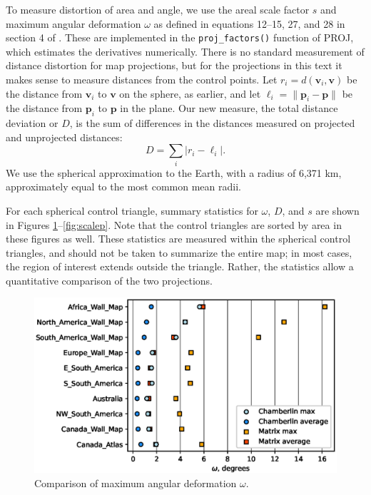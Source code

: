 \documentclass[]{interact}
\begin{document}
To measure distortion of area and angle, we use the areal scale factor $s$ and
maximum angular deformation $\omega$ as defined in equations 12--15, 27, and 28
in section 4 of \citet{snyder87}. These are implemented in the
\verb|proj_factors()| function of PROJ, which estimates the derivatives
numerically. There is no standard measurement of distance distortion for map
projections, but for the projections in this text it makes sense to measure
distances from the control points. Let $r_i = d(\mathbf v_i, \mathbf v)$ be the
distance from $\mathbf v_i$ to $\mathbf v$ on the sphere, as earlier, and let
$\ell_i = \|\mathbf p_i - \mathbf p\|$ be the distance from $\mathbf p_i$ to
$\mathbf p$ in the plane.
Our new measure, the total distance deviation or $D$, is the sum of
differences in the distances measured on projected and unprojected distances:
\begin{equation}
 D = \sum_i \left| r_i - \ell_i \right|.
\end{equation}
We use the spherical approximation to the Earth, with a radius of 6,371 km,
approximately equal to the most common mean radii. \citep{snyder87}

For each spherical control triangle, summary statistics for $\omega$, $D$, and
$s$ are shown in Figures \ref{fig:omegap}--\ref{fig:scalep}. Note that the
control triangles are sorted by area in these figures as well.
These statistics are measured within the spherical control triangles,
and should not be taken to summarize the entire map; in most cases,
the region of interest extends outside the triangle.
Rather, the statistics allow a quantitative comparison of the two projections.

\begin{figure}
  \includegraphics[width=\textwidth]{omegaplot}
  \caption{Comparison of maximum angular deformation $\omega$.}
  \label{fig:omegap}
\end{figure}
\end{document}
